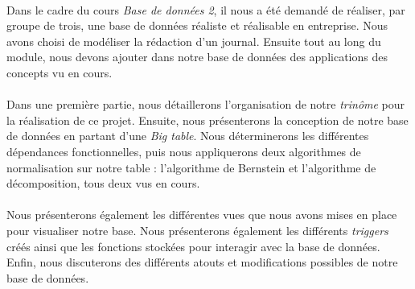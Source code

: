 \paragraph{}{
    Dans le cadre du cours \textit{Base de données 2}, il nous a été demandé de réaliser, par groupe de trois, une base de données réaliste et réalisable en entreprise. Nous avons choisi de modéliser la rédaction d'un journal. Ensuite tout au long du module, nous devons ajouter dans notre base de données des applications des concepts vu en cours.
}

\paragraph{}{
    Dans une première partie, nous détaillerons l'organisation de notre \textit{trinôme} pour la réalisation de ce projet. Ensuite, nous présenterons la conception de notre base de données en partant d'une \textit{Big table}. Nous déterminerons les différentes dépendances fonctionnelles, puis nous appliquerons deux algorithmes de normalisation sur notre table : l'algorithme de Bernstein et l'algorithme de décomposition, tous deux vus en cours.
}

\paragraph{}{
    Nous présenterons également les différentes vues que nous avons mises en place pour visualiser notre base. Nous présenterons également les différents \textit{triggers} créés ainsi que les fonctions stockées pour interagir avec la base de données. \newline
    Enfin, nous discuterons des différents atouts et modifications possibles de notre base de données.
}